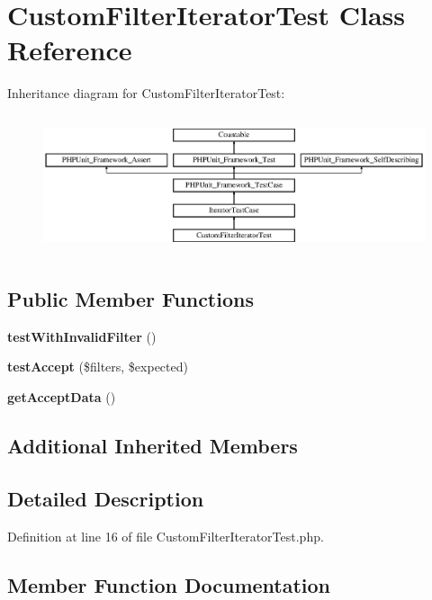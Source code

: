 \section{Custom\+Filter\+Iterator\+Test Class Reference}
\label{class_symfony_1_1_component_1_1_finder_1_1_tests_1_1_iterator_1_1_custom_filter_iterator_test}
Inheritance diagram for Custom\+Filter\+Iterator\+Test\+:\begin{figure}[H]
\begin{center}
\leavevmode
\includegraphics[height=4.129793cm]{class_symfony_1_1_component_1_1_finder_1_1_tests_1_1_iterator_1_1_custom_filter_iterator_test}
\end{center}
\end{figure}
\subsection*{Public Member Functions}
\begin{DoxyCompactItemize}
\item 
{\bf test\+With\+Invalid\+Filter} ()
\item 
{\bf test\+Accept} (\$filters, \$expected)
\item 
{\bf get\+Accept\+Data} ()
\end{DoxyCompactItemize}
\subsection*{Additional Inherited Members}


\subsection{Detailed Description}


Definition at line 16 of file Custom\+Filter\+Iterator\+Test.\+php.



\subsection{Member Function Documentation}
